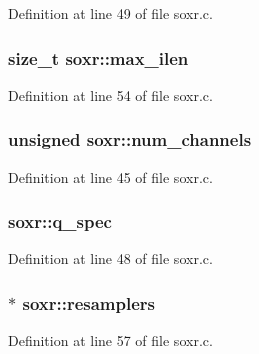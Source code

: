 Definition at line 49 of file soxr.\+c.

\subsubsection[{\texorpdfstring{max\+\_\+ilen}{max_ilen}}]{\setlength{\rightskip}{0pt plus 5cm}size\+\_\+t soxr\+::max\+\_\+ilen}\hypertarget{structsoxr_aef67b4a20e64992d21b55411ac82863f}{}\label{structsoxr_aef67b4a20e64992d21b55411ac82863f}


Definition at line 54 of file soxr.\+c.

\subsubsection[{\texorpdfstring{num\+\_\+channels}{num_channels}}]{\setlength{\rightskip}{0pt plus 5cm}unsigned soxr\+::num\+\_\+channels}\hypertarget{structsoxr_a778913150a0ebcbe2f8f918bea261b1f}{}\label{structsoxr_a778913150a0ebcbe2f8f918bea261b1f}


Definition at line 45 of file soxr.\+c.

\subsubsection[{\texorpdfstring{q\+\_\+spec}{q_spec}}]{ soxr\+::q\+\_\+spec}\hypertarget{structsoxr_ad86308d2e768fb9f67ec488772e73d5c}{}\label{structsoxr_ad86308d2e768fb9f67ec488772e73d5c}


Definition at line 48 of file soxr.\+c.

\subsubsection[{\texorpdfstring{resamplers}{resamplers}}]{$\ast$ soxr\+::resamplers}\hypertarget{structsoxr_a0a7572ca0ce1d351fdf4c2a72ec48657}{}\label{structsoxr_a0a7572ca0ce1d351fdf4c2a72ec48657}


Definition at line 57 of file soxr.\+c.

